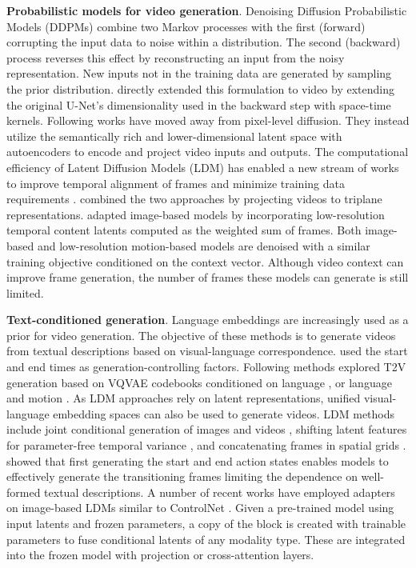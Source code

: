 \noindent
\textbf{Probabilistic models for video generation}. Denoising Diffusion Probabilistic Models (DDPMs)  combine two Markov processes with the first (forward) corrupting the input data to noise within a distribution. The second (backward) process reverses this effect by reconstructing an input from the noisy representation. New inputs not in the training data are generated by sampling the prior distribution.  directly extended this formulation to video by extending the original U-Net's  dimensionality used in the backward step with space-time kernels. Following works  have moved away from pixel-level diffusion. They instead utilize the semantically rich and lower-dimensional latent space  with autoencoders to encode and project video inputs and outputs. The computational efficiency of Latent Diffusion Models (LDM) has enabled a new stream of works to improve temporal alignment of frames  and minimize training data requirements .  combined the two approaches by projecting videos to triplane representations.  adapted image-based models by incorporating low-resolution temporal content latents computed as the weighted sum of frames. Both image-based and low-resolution motion-based models are denoised with a similar training objective conditioned on the context vector. Although video context can improve frame generation, the number of frames these models can generate is still limited. 


\noindent
\textbf{Text-conditioned generation}. Language embeddings are increasingly used as a prior for video generation. The objective of these methods is to generate videos from textual descriptions based on visual-language correspondence.  used the start and end times as generation-controlling factors. 
Following methods explored T2V generation based on VQVAE codebooks conditioned on language , or language and motion . As LDM approaches rely on latent representations, unified visual-language embedding spaces can also be used to generate videos. LDM methods include joint conditional generation of images and videos , shifting latent features for parameter-free temporal variance , and concatenating frames in spatial grids .  showed that
first generating the start and end action states enables models to effectively generate the transitioning frames limiting the dependence on well-formed textual descriptions. A number of recent works  have employed adapters on image-based LDMs similar to ControlNet . Given a pre-trained model using input latents and frozen parameters, a copy of the block is created with trainable parameters to fuse conditional latents of any modality type. These are integrated into the frozen model with projection or cross-attention layers.


